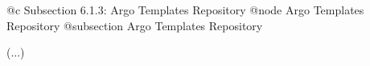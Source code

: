 @c Subsection 6.1.3: Argo Templates Repository
@node Argo Templates Repository
@subsection Argo Templates Repository

(...)

